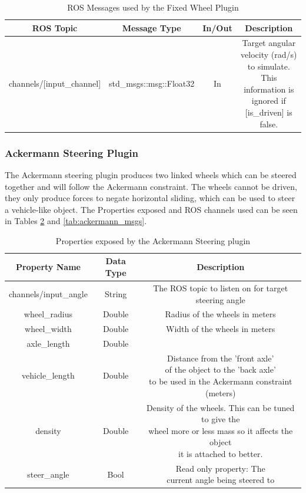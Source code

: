 \begin{itemize}
\begin{table}[h!]
	\centering
	\caption{ROS Messages used by the Fixed Wheel Plugin}
	\label{tab:fixedwheel_msgs}
	\begin{tabular}{c|c|c|c}
	ROS Topic & Message Type & In/Out & Description\\ \hline \hline
	channels/[input\_channel] & std\_msgs::msg::Float32 & In & \makecell{Target angular velocity (rad/s) to simulate.\\ This information is ignored if [is\_driven] is false.}
	\end{tabular}
\end{table}

\subsubsection*{Ackermann Steering Plugin}
The Ackermann steering plugin produces two linked wheels which can be steered together and will follow the Ackermann constraint. The wheels cannot be driven, they only produce forces to negate horizontal sliding, which can be used to steer a vehicle-like object. The Properties exposed and ROS channels used can be seen in Tables \ref{tab:ackermann_props} and \ref{tab:ackermann_msgs}.

\begin{table}[h!]
	\centering
	\caption{Properties exposed by the Ackermann Steering plugin}
	\label{tab:ackermann_props}
	\begin{tabular}{c|c|c}
	Property Name & Data Type & Description\\ \hline \hline
	channels/input\_angle & String & The ROS topic to listen on for target steering angle\\ \hline
	wheel\_radius & Double & Radius of the wheels in meters\\ \hline
	wheel\_width & Double & Width of the wheels in meters\\ \hline
	axle\_length & Double & \makecell{Distance between the two wheels (meters)}\\ \hline
	vehicle\_length & Double & \makecell{Distance from the 'front axle'\\ of the object to the 'back axle'\\ to be used in the Ackermann constraint (meters)}\\ \hline
	density & Double & \makecell{Density of the wheels. This can be tuned to give the\\ wheel more or less mass so it affects the object\\ it is attached to better.}\\ \hline
	steer\_angle & Bool & \makecell{Read only property: The\\ current angle being steered to}
	\end{tabular}
\end{table}


\end{itemize}
